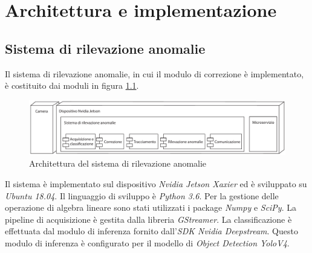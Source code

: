 \chapter{Architettura e implementazione}
\label{sec:implementazione}



\section{Sistema di rilevazione anomalie}
Il sistema di rilevazione anomalie, in cui il modulo di correzione è implementato, è costituito dai moduli in figura \ref{fig:sys modules}.
\begin{figure}
    \caption{Architettura del sistema di rilevazione anomalie}
    \label{fig:sys modules}
    \centering
    \includegraphics[width=\textwidth]{images/arch.pdf}
\end{figure}
Il sistema è implementato sul dispositivo \emph{Nvidia Jetson Xaxier}\cite{arch:jetson} ed è sviluppato su \emph{Ubuntu 18.04}\cite{arch:ubuntu}.
Il linguaggio di sviluppo è \emph{Python 3.6}\cite{arch:python}.
Per la gestione delle operazione di algebra lineare sono stati utilizzati i package \emph{Numpy}\cite{arch:numpy} e \emph{SciPy}\cite{arch:scipy}.
La pipeline di acquisizione è gestita dalla libreria \emph{GStreamer}\cite{arch:gstreamer}.
La classificazione è effettuata dal modulo di inferenza fornito dall'\emph{SDK Nvidia Deepstream}\cite{arch:deepstream}.
Questo modulo di inferenza è configurato per il modello di \emph{Object Detection YoloV4}\cite{arch:yolo}.


